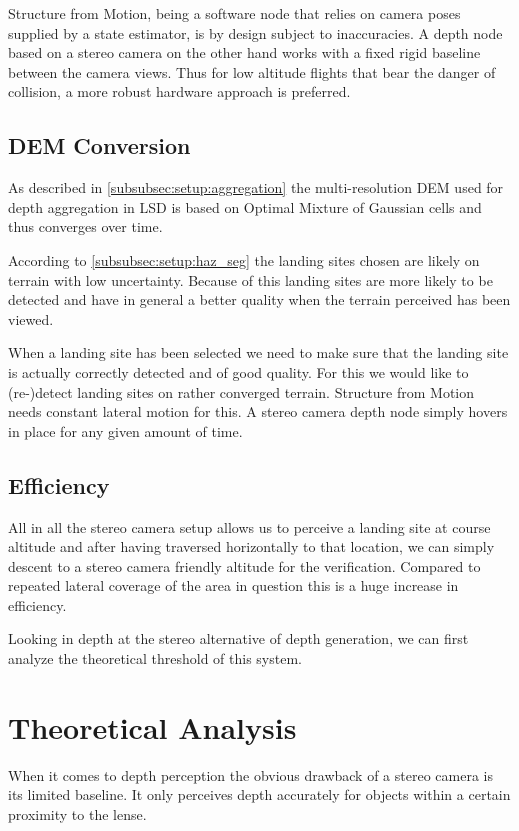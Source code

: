 Structure from Motion, being a software node that relies on camera poses supplied by a state estimator, is by design subject to inaccuracies. A depth node based on a stereo camera on the other hand works with a fixed rigid baseline between the camera views. Thus for low altitude flights that bear the danger of collision, a more robust hardware approach is preferred.

\subsection{DEM Conversion}

As described in \cref{subsubsec:setup:aggregation} the multi-resolution DEM used for depth aggregation in LSD is based on Optimal Mixture of Gaussian cells and thus converges over time. 

According to \cref{subsubsec:setup:haz_seg} the landing sites chosen are likely on terrain with low uncertainty. Because of this landing sites are more likely to be detected and have in general a better quality when the terrain perceived has been viewed.

When a landing site has been selected we need to make sure that the landing site is actually correctly detected and of good quality. For this we would like to (re-)detect landing sites on rather converged terrain. Structure from Motion needs constant lateral motion for this. A stereo camera depth node simply hovers in place for any given amount of time.

\subsection{Efficiency}

All in all the stereo camera setup allows us to perceive a landing site at course altitude and after having traversed horizontally to that location, we can simply descent to a stereo camera friendly altitude for the verification. Compared to repeated lateral coverage of the area in question this is a huge increase in efficiency.

Looking in depth at the stereo alternative of depth generation, we can first analyze the theoretical threshold of this system.

\section{Theoretical Analysis}

When it comes to depth perception the obvious drawback of a stereo camera is its limited baseline. It only perceives depth accurately for objects within a certain proximity to the lense. 

